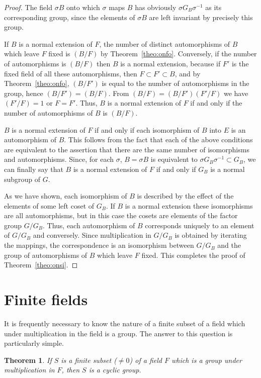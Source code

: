 \documentclass[10pt,leqno,a5paper]{book}
\newtheorem{theo}{Theorem}
\theoremstyle{definition}
\let\htw\section
\begin{document}
\begin{proof}
The field $\sigma B$ onto which $\sigma$ maps $B$ has obviously $\sigma G_B \sigma^{-1}$ as its corresponding group, since the elements of $\sigma B$ are left invariant by precisely this group.

If $B$ is a normal extension of $F$, the number of distinct automorphisms of $B$ which leave $F$ fixed is $(B/F)$ by Theorem~\ref{theo:onfo}.
Conversely, if the number of automorphisms is $(B/F)$ then $B$ is a normal extension, because if $F'$ is the fixed field of all these automorphisms, then $F \subset F' \subset B$, and by Theorem~\ref{theo:onfo}, $(B/F')$ is equal to the number of automorphisms in the group, hence $(B/F') = (B/F)$.
From $(B/F) = (B/F') (F'/F)$ we have $(F'/F) = 1$ or $F = F'$.
Thus, $B$ is a normal extension of $F$ if and only if the number of automorphisms of $B$ is $(B/F)$.

$B$ is a normal extension of $F$ if and only if each isomorphism of $B$ into $E$ is an automorphism of $B$.
This follows from the fact that each of the above conditions are equivalent to the assertion that there are the same number of isomorphisms and automorphisms.
Since, for each $\sigma$, $B = \sigma B$ is equivalent to $\sigma G_B \sigma^{-1} \subset G_B$, we can finally say that $B$ is a normal extension of $F$ if and only if $G_B$ is a normal subgroup of $G$.

As we have shown, each isomorphism of $B$ is described by the effect of the elements of some left coset of $G_B$.
If $B$ is a normal extension these isomorphisms are all automorphisms, but in this case the cosets are elements of the factor group $G/G_B$.
Thus, each automorphism of $B$ corresponds uniquely to an element of $G/G_B$ and conversely.
Since multiplication in $G/G_B$ is obtained by iterating the mappings, the correspondence is an isomorphism between $G/G_B$ and the group of automorphisms of $B$ which leave $F$ fixed.
This completes the proof of Theorem~\ref{theo:onsi}.
\end{proof}


\htw{Finite fields}

It is frequently necessary to know the nature of a finite subset of a field which under multiplication in the field is a group.
The answer to this question is particularly simple.


\begin{theo}
\label{theo:onse}
If $S$ is a finite subset ($\not= 0$) of a field $F$ which is a group under multiplication in $F$, then $S$ is a cyclic group.
\end{theo}
\end{document}
